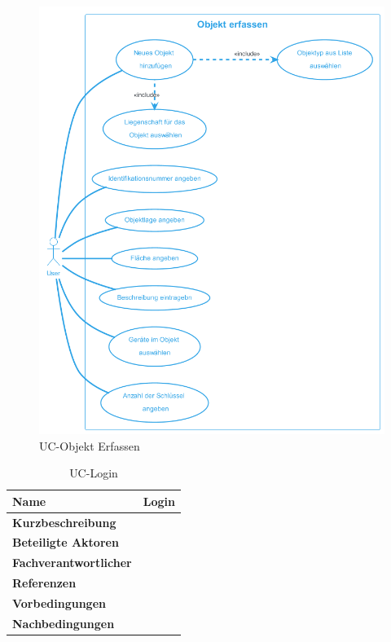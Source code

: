 \begin{figure}[H]
  \begin{center}
    \includegraphics[width=0.8\linewidth]{content/diagrams/out/usecase/objektErfassen/ObjektErfassen.png}
    \caption{UC-Objekt Erfassen}
  \end{center}
  \label{objekt}
\end{figure}

\begin{table}[H]
  \centering
  \settowidth{}
  \setlength\extrarowheight{2pt}
  \begin{tabulary}{1.0\textwidth}{|a|m{12cm}|}
    \hline
    \textbf{Name}& Login\\
    \hline 
    \textbf{Kurzbeschreibung} & \\
    \hline
    \textbf{Beteiligte Aktoren} & \\
    \hline
    \textbf{Fachverantwortlicher} & \\
    \hline
    \textbf{Referenzen} & \\
    \hline
    \textbf{Vorbedingungen} & \\
    \hline
    \textbf{Nachbedingungen} & \\
    \hline
  \end{tabulary}
  \caption{UC-Login}
\end{table}

